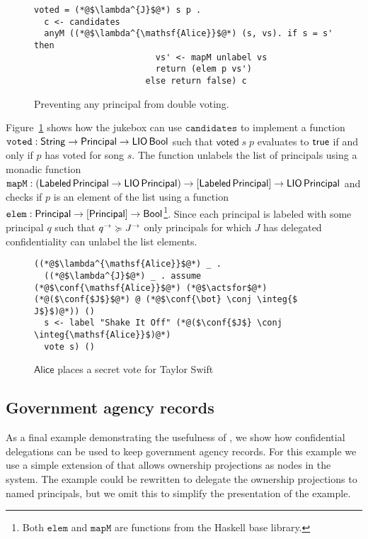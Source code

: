 \begin{figure}
\centering
\begin{lstlisting}
voted = (*@$\lambda^{J}$@*) s p .
  c <- candidates
  anyM ((*@$\lambda^{\mathsf{Alice}}$@*) (s, vs). if s = s' then
                        vs' <- mapM unlabel vs
                        return (elem p vs')
                      else return false) c
\end{lstlisting}
\caption{Preventing any principal from double voting.}
\label{fig:prevent-double-voting}
\end{figure}

Figure~\ref{fig:prevent-double-voting} shows how the jukebox can use $\mathtt{candidates}$ to implement a function $\mathtt{voted}: \mathsf{String} \to \mathsf{Principal} \to \mathsf{LIO}\,\mathsf{Bool}$ such that $\mathsf{voted}\; s\; p$ evaluates to $\mathsf{true}$ if and only if $p$ has voted for song $s$. The function unlabels the list of principals using a monadic function $\mathtt{mapM}: (\mathsf{Labeled}\,\mathsf{Principal} \to \mathsf{LIO}\,\mathsf{Principal}) \to \lbrack\mathsf{Labeled}\,\mathsf{Principal}\rbrack \to \mathsf{LIO}\,\mathsf{Principal}$ and checks if $p$ is an element of the list using a function $\mathtt{elem}: \mathsf{Principal} \to \lbrack\mathsf{Principal}\rbrack \to \mathsf{Bool}$\footnote{Both $\mathtt{elem}$ and $\mathtt{mapM}$ are functions from the Haskell base library.}. Since each principal is labeled with some principal $q$ such that $q^{\rightarrow} \succcurlyeq J^{\rightarrow}$ only principals for which $J$ has delegated confidentiality can unlabel the list elements.

\begin{figure}
\centering
\begin{lstlisting}
((*@$\lambda^{\mathsf{Alice}}$@*) _ .
  ((*@$\lambda^{J}$@*) _ . assume (*@$\conf{\mathsf{Alice}}$@*) (*@$\actsfor$@*) (*@($\conf{$J$}$@*) @ (*@$\conf{\bot} \conj \integ{$ J$}$)@*)) ()
  s <- label "Shake It Off" (*@($\conf{$J$} \conj \integ{\mathsf{Alice}}$)@*)
  vote s) ()
\end{lstlisting}
\caption{$\mathsf{Alice}$ places a secret vote for Taylor Swift}
\label{fig:jukebox-alice-votes-for-taylor-swift}
\end{figure}

\subsection{Government agency records}
As a final example demonstrating the usefulness of \lang, we show how confidential delegations can be used to keep government agency records. For this example we use a simple extension of \lang{} that allows ownership projections as nodes in the system. The example could be rewritten to delegate the ownership projections to named principals, but we omit this to simplify the presentation of the example.

